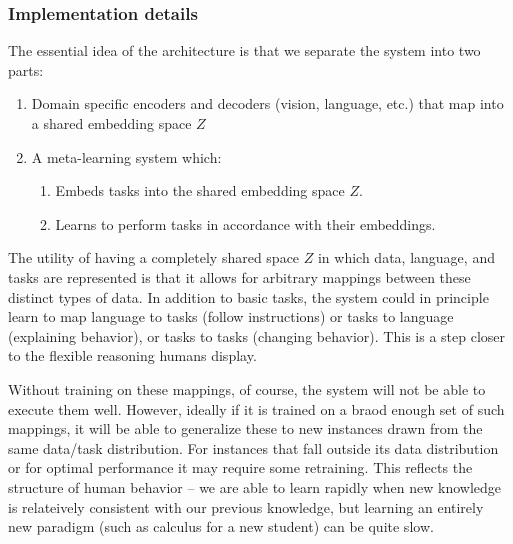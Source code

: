 \documentclass[11pt]{article}
\begin{document}
\subsubsection{Implementation details}
The essential idea of the architecture is that we separate the system into two parts:
\begin{enumerate}
\item Domain specific encoders and decoders (vision, language, etc.) that map into a shared embedding space $Z$
\item A meta-learning system which:
    \begin{enumerate}
    \item Embeds tasks into the shared embedding space $Z$.
    \item Learns to perform tasks in accordance with their embeddings.
    \end{enumerate}
\end{enumerate}
The utility of having a completely shared space $Z$ in which data, language, and tasks are represented is that it allows for arbitrary mappings between these distinct types of data. In addition to basic tasks, the system could in principle learn to map language to tasks (follow instructions) or tasks to language (explaining behavior), or tasks to tasks (changing behavior). This is a step closer to the flexible reasoning humans display. \par
Without training on these mappings, of course, the system will not be able to execute them well. However, ideally if it is trained on a braod enough set of such mappings, it will be able to generalize these to new instances drawn from the same data/task distribution. For instances that fall outside its data distribution or for optimal performance it may require some retraining. This reflects the structure of human behavior -- we are able to learn rapidly when new knowledge is relateively consistent with our previous knowledge, but learning an entirely new paradigm (such as calculus for a new student) can be quite slow. \par
\end{document}
